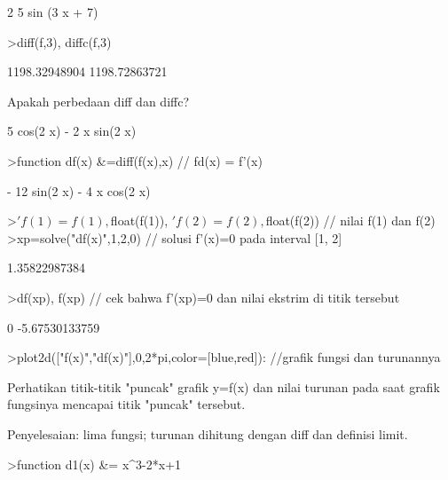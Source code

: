 \documentclass[a4paper,10pt]{article}
\begin{document}
\begin{eulernotebook}
\begin{euleroutput}
                                 2    5
                              sin (3 x  + 7)
  
\end{euleroutput}
\begin{eulerprompt}
>diff(f,3), diffc(f,3)
\end{eulerprompt}
\begin{euleroutput}
  1198.32948904
  1198.72863721
\end{euleroutput}
\begin{eulercomment}
Apakah perbedaan diff dan diffc?
\end{eulercomment}
\begin{euleroutput}
  
                        5 cos(2 x) - 2 x sin(2 x)
  
\end{euleroutput}
\begin{eulerprompt}
>function df(x) &=diff(f(x),x) // fd(x) = f'(x)
\end{eulerprompt}
\begin{euleroutput}
  
                       - 12 sin(2 x) - 4 x cos(2 x)
  
\end{euleroutput}
\begin{eulerprompt}
>$'f(1)=f(1), $float(f(1)), $'f(2)=f(2), $float(f(2)) // nilai f(1) dan f(2)
>xp=solve("df(x)",1,2,0) // solusi f'(x)=0 pada interval [1, 2]
\end{eulerprompt}
\begin{euleroutput}
  1.35822987384
\end{euleroutput}
\begin{eulerprompt}
>df(xp), f(xp) // cek bahwa f'(xp)=0 dan nilai ekstrim di titik tersebut
\end{eulerprompt}
\begin{euleroutput}
  0
  -5.67530133759
\end{euleroutput}
\begin{eulerprompt}
>plot2d(["f(x)","df(x)"],0,2*pi,color=[blue,red]): //grafik fungsi dan turunannya
\end{eulerprompt}
\begin{eulercomment}
Perhatikan titik-titik "puncak" grafik y=f(x) dan nilai turunan pada saat grafik fungsinya mencapai titik "puncak" tersebut.
\end{eulercomment}
\begin{eulercomment}
Penyelesaian: lima fungsi; turunan dihitung dengan diff dan definisi limit.
\end{eulercomment}
\begin{eulerprompt}
>function d1(x) &= x^3-2*x+1
\end{eulerprompt}
\begin{euleroutput}
  

\end{euleroutput}
\end{eulernotebook}
\end{document}
